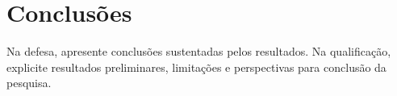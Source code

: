 \chapter{Conclusões}
Na defesa, apresente conclusões sustentadas pelos resultados. Na qualificação, explicite resultados preliminares, limitações e perspectivas para conclusão da pesquisa.
